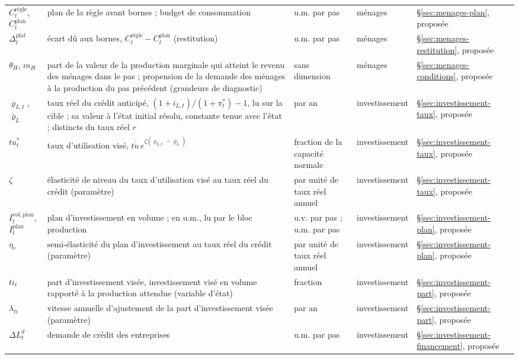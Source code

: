 \documentclass[11pt,a4paper]{article}
\begin{document}
\begin{center}
\begin{longtable}{>{\raggedright\arraybackslash}p{1.6cm}>{\raggedright\arraybackslash}p{5.6cm}>{\raggedright\arraybackslash}p{2.0cm}>{\raggedright\arraybackslash}p{2.2cm}>{\raggedright\arraybackslash}p{2.8cm}}
$C^{\text{règle}}_t$, $C^{\mathrm{plan}}_t$ & plan de la règle avant bornes ; budget de consommation & u.m. par pas & ménages & \S\ref{sec:menages-plan}, proposée\\
$\Delta^{\mathrm{plaf}}_t$ & écart dû aux bornes, $C^{\text{règle}}_t - C^{\mathrm{plan}}_t$ (restitution) & u.m. par pas & ménages & \S\ref{sec:menages-restitution}, proposée\\
$\theta_H$, $m_H$ & part de la valeur de la production marginale qui atteint le revenu des ménages dans le pas ; propension de la demande des ménages à la production du pas précédent (grandeurs de diagnostic) & sans dimension & ménages & \S\ref{sec:menages-conditions}, proposée\\
$\varrho_{L,t}$, $\bar\varrho_L$ & taux réel du crédit anticipé, $(1 + i_{L,t})/(1 + \pi^\ast_t) - 1$, lu sur la cible ; sa valeur à l'état initial résolu, constante tenue avec l'état ; distincts du taux réel $r$ & par an & investissement & \S\ref{sec:investissement-taux}, proposée\\
$\mathit{tu}^\ast_t$ & taux d'utilisation visé, $\overline{\mathit{tu}}\,e^{\zeta(\varrho_{L,t} - \bar\varrho_L)}$ & fraction de la capacité normale & investissement & \S\ref{sec:investissement-taux}, proposée\\
$\zeta$ & élasticité de niveau du taux d'utilisation visé au taux réel du crédit (paramètre) & par unité de taux réel annuel & investissement & \S\ref{sec:investissement-taux}, proposée\\
$I^{\mathrm{vol},\mathrm{plan}}_t$, $I^{\mathrm{plan}}_t$ & plan d'investissement en volume ; en u.m., lu par le bloc production & u.v. par pas ; u.m. par pas & investissement & \S\ref{sec:investissement-plan}, proposée\\
$\eta_r$ & semi-élasticité du plan d'investissement au taux réel du crédit (paramètre) & par unité de taux réel annuel & investissement & \S\ref{sec:investissement-plan}, proposée\\
$\mathit{ti}_t$ & part d'investissement visée, investissement visé en volume rapporté à la production attendue (variable d'état) & fraction & investissement & \S\ref{sec:investissement-part}, proposée\\
$\lambda_{\mathit{ti}}$ & vitesse annuelle d'ajustement de la part d'investissement visée (paramètre) & par an & investissement & \S\ref{sec:investissement-part}, proposée\\
$\Delta L^d_t$ & demande de crédit des entreprises & u.m. par pas & investissement & \S\ref{sec:investissement-financement}, proposée\\

\end{longtable}
\end{center}
\end{document}
